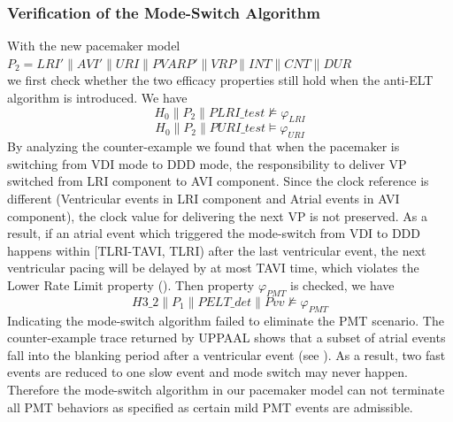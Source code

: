 \subsubsection{Verification of the Mode-Switch Algorithm}
With the new pacemaker model\\ 
$P_2=LRI'\|AVI'\|URI\|PVARP'\|VRP\|INT\|CNT\|DUR$\\
we first check whether the two efficacy properties still hold when the anti-ELT algorithm is introduced. We have 
$$H_0\|P_2\|PLRI\_test\not\models\varphi_{LRI}$$
$$H_0\|P_2\|PURI\_test\models\varphi_{URI}$$
By analyzing the counter-example we found that when the pacemaker is switching from VDI mode to DDD mode, the responsibility to deliver VP switched from LRI component to AVI component. Since the clock reference is different (Ventricular events in LRI component and Atrial events in AVI component), the clock value for delivering the next VP is not preserved. As a result, if an atrial event which triggered the mode-switch from VDI to DDD happens within [TLRI-TAVI, TLRI) after the last ventricular event, the next ventricular pacing will be delayed by at most TAVI time, which violates the Lower Rate Limit property (). 
Then property $\varphi_{PMT}$ is checked, we have
$$H3\_2\|P_1\|PELT\_det\|Pvv\not\models\varphi_{PMT}$$
Indicating the mode-switch algorithm failed to eliminate the PMT scenario. The counter-example trace returned by UPPAAL shows that a subset of atrial events fall into the blanking period after a ventricular event (see ). As a result, two fast events are reduced to one slow event and mode switch may never happen. Therefore the mode-switch algorithm in our pacemaker model can not terminate all PMT behaviors as specified as certain mild PMT events are admissible.
